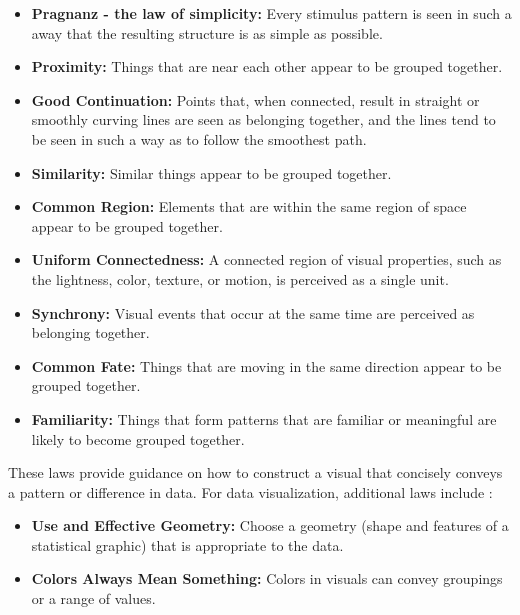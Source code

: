 \documentclass[11pt,]{isuthesis}
\begin{document}
\begin{itemize}
\item
  \textbf{Pragnanz - the law of simplicity:} Every stimulus pattern is seen in such a away that the resulting structure is as simple as possible.
\item
  \textbf{Proximity:} Things that are near each other appear to be grouped together.
\item
  \textbf{Good Continuation:} Points that, when connected, result in straight or smoothly curving lines are seen as belonging together, and the lines tend to be seen in such a way as to follow the smoothest path.
\item
  \textbf{Similarity:} Similar things appear to be grouped together.
\item
  \textbf{Common Region:} Elements that are within the same region of space appear to be grouped together.
\item
  \textbf{Uniform Connectedness:} A connected region of visual properties, such as the lightness, color, texture, or motion, is perceived as a single unit.
\item
  \textbf{Synchrony:} Visual events that occur at the same time are perceived as belonging together.
\item
  \textbf{Common Fate:} Things that are moving in the same direction appear to be grouped together.
\item
  \textbf{Familiarity:} Things that form patterns that are familiar or meaningful are likely to become grouped together.
\end{itemize}

These laws provide guidance on how to construct a visual that concisely conveys a pattern or difference in data.
For data visualization, additional laws include \citep{Midway2020}:

\begin{itemize}
\item
  \textbf{Use and Effective Geometry:} Choose a geometry (shape and features of a statistical graphic) that is appropriate to the data.
\item
  \textbf{Colors Always Mean Something:} Colors in visuals can convey groupings or a range of values.
\end{itemize}
\end{document}
